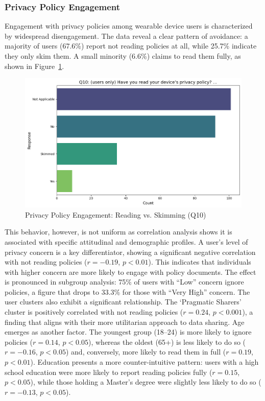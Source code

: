 	\subsubsection{Privacy Policy Engagement}
	Engagement with privacy policies among wearable device users is characterized by widespread disengagement. The data reveal a clear pattern of avoidance: a majority of users (67.6\%) report not reading policies at all, while 25.7\% indicate they only skim them. A small minority (6.6\%) claims to read them fully, as shown in Figure~\ref{fig:Q10_policy_engagement}.
	\begin{figure}[ht]\centering
		\includegraphics[width=0.7\linewidth]{figures/questions/Q10_single_choice.png}
		\caption{Privacy Policy Engagement: Reading vs. Skimming (Q10)}
		\label{fig:Q10_policy_engagement}
	\end{figure}
	This behavior, however, is not uniform as correlation analysis shows it is associated with specific attitudinal and demographic profiles. A user's level of privacy concern is a key differentiator, showing a significant negative correlation with not reading policies ($r = -0.19$, $p < 0.01$). This indicates that individuals with higher concern are more likely to engage with policy documents. The effect is pronounced in subgroup analysis: 75\% of users with ``Low'' concern ignore policies, a figure that drops to 33.3\% for those with ``Very High'' concern.
	The user clusters also exhibit a significant relationship. The `Pragmatic Sharers' cluster is positively correlated with not reading policies ($r = 0.24$, $p < 0.001$), a finding that aligns with their more utilitarian approach to data sharing.
	Age emerges as another factor. The youngest group (18--24) is more likely to ignore policies ($r = 0.14$, $p < 0.05$), whereas the oldest (65+) is less likely to do so ($r = -0.16$, $p < 0.05$) and, conversely, more likely to read them in full ($r = 0.19$, $p < 0.01$). Education presents a more counter-intuitive pattern: users with a high school education were more likely to report reading policies fully ($r = 0.15$, $p < 0.05$), while those holding a Master's degree were slightly less likely to do so ($r = -0.13$, $p < 0.05$).	


